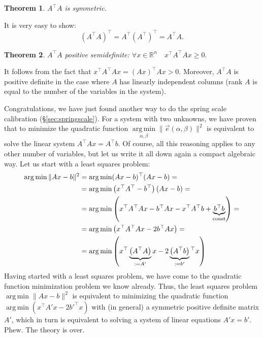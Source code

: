 \documentclass[notitlepage,oneside]{book}
\DeclareMathOperator*{\argmin}{arg\,min}
\newtheorem{theorem}{Theorem}
\begin{document}
\begin{theorem}
$A^\top A$ is symmetric.
\end{theorem}
It is very easy to show:
$$
(A^\top A)^\top = A^\top (A^\top)^\top = A^\top A.
$$

\begin{theorem}
	$A^\top A$ positive semidefinite: $\forall x\in \mathbb R^n\quad x^\top A^\top A x \geq 0.$
\end{theorem}
It follows from the fact that $x^\top A^\top A x = (A x)^\top A x > 0$.
Moreover, $A^\top A$ is positive definite in the case where $A$ has linearly independent columns (rank $A$ is equal to the number of the variables in the system).

\vspace{5mm}

Congratulations, we have just found another way to do the spring scale calibration (\S\ref{sec:springscale}).
For a system with two unknowns, we have proven that to minimize the quadratic function $\argmin\limits_{\alpha, \beta} \|\vec{e}(\alpha, \beta)\|^2$
is equivalent to solve the linear system $A^\top A x = A^\top b$.
Of course, all this reasoning applies to any other number of variables, but let us write it all down again a compact algebraic way.
Let us start with a least squares problem:
\begin{align*}
\argmin \| Ax - b \|^2 &= \argmin (Ax-b)^\top (Ax-b) =\\
& = \argmin\left(x^\top A^\top - b^\top\right)(Ax-b) = \\
& = \argmin\left(x^\top A^\top A x - b^\top Ax - x^\top A^\top b + \underbrace{b^\top b}_{\rm const}\right)=\\
& = \argmin\left(x^\top A^\top A x - 2b^\top Ax\right) = \\
& = \argmin\left(x^\top \underbrace{\left(A^\top A\right)}_{:=A'} x - 2\underbrace{\left(A^\top b\right)}_{:=b'}\phantom{}^\top x\right)
\end{align*}
Having started with a least squares problem, we have come to the quadratic function minimization problem we know already.
Thus, the least squares problem $\argmin \| Ax - b \|^2$  is equivalent to minimizing the quadratic function $\argmin \left(x^\top A' x - 2b'^\top x\right)$ 
with (in general) a symmetric positive definite matrix $A'$, which in turn is equivalent to solving a system of linear equations $A'x = b'$. Phew. The theory is over.


\end{document}
